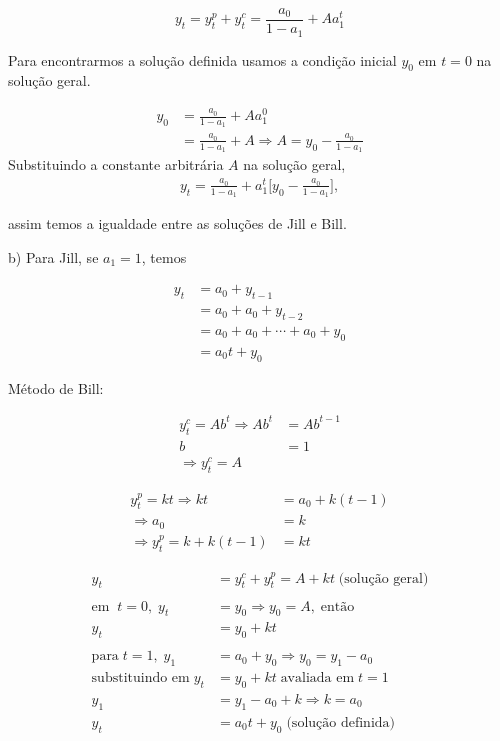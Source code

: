 \begin{enumerate}
	\begin{equation*}
		y_t=y_t^p+y_t^c=\frac{a_0}{1-a_1}+Aa_1^t
	\end{equation*}
	
	Para encontrarmos a solução definida usamos a condição inicial $y_0$ em $t=0$ na solução geral.
	
	\begin{align*}
		y_0&=\frac{a_0}{1-a_1}+Aa_1^0\\
		&= \frac{a_0}{1-a_1}+A \Rightarrow A=y_0-\frac{a_0}{1-a_1}
	\end{align*}
	Substituindo a constante arbitrária $A$ na solução geral, 
	\begin{align*}
		y_t=\frac{a_0}{1-a_1}+a_1^t\bigg[y_0-\frac{a_0}{1-a_1}\bigg],
	\end{align*}
	
	assim temos a igualdade entre as soluções de Jill e Bill.
	
	b) Para Jill, se $a_1=1$, temos
	
	\begin{align*}
	y_t&=a_0+y_{t-1}\\
	&=a_0+a_0+y_{t-2}\\
	&=a_0+a_0+\cdots+a_0+y_0\\
	&=a_0t+y_0
	\end{align*}
	
	Método de Bill:
	
	\begin{align*}
		y_t^c=Ab^t \Rightarrow Ab^t&=Ab^{t-1}\\
		b&=1\\
		\Rightarrow y_t^c=A	&
	\end{align*}
	
	\begin{align*}
		y_t^p=kt \Rightarrow kt&=a_0+k(t-1)\\
		\Rightarrow a_0&=k\\
		\Rightarrow y_t^p=k+k(t-1)&=kt
	\end{align*}
	
	\begin{align*}
		y_t&=y_t^c+y_t^p=A+kt \;\text{(solução geral)}\\
		\\
	\text{em}\;\; t=0,\; y_t&=y_0 \Rightarrow y_0=A,\; \text{então}\\
	y_t&=y_0+kt\\
	\\
	\text{para}\; t=1,\; y_1&=a_0+y_0\Rightarrow y_0=y_1-a_0\\
	\text{substituindo em}\; y_t&=y_0+kt\; \text{avaliada em} \;t=1\\
	y_1&=y_1-a_0+k \Rightarrow k=a_0\\
	y_t&=a_0t+y_0 \;\text{(solução definida)}
	\end{align*}
	

\end{enumerate}
